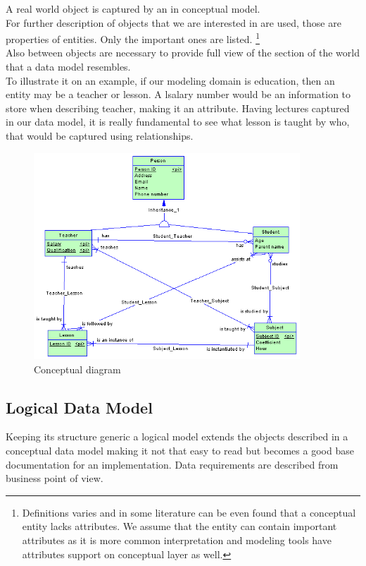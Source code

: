A real world object is captured by an  in conceptual model. \\
For further description of objects that we are interested in  are used, those are properties of entities. Only the important ones are listed. \footnote{Definitions varies and in some literature can be even found that a conceptual entity lacks attributes. We assume that the entity can contain important attributes as it is more common interpretation and modeling tools have attributes support on conceptual layer as well.} \\
Also  between objects are necessary to provide full view of the section of the world that a data model resembles. \\

To illustrate it on an example, if our modeling domain is education, then an entity may be a teacher or lesson. 
A lsalary number would be an information to store when describing teacher, making it an attribute.
Having lectures captured in our data model, it is really fundamental to see what lesson is taught by who, that would be captured using relationships.

\begin{figure}[H]
	\centering
	\includegraphics[width=10cm]{../img/Conceptual_Model_PowerDesigner}
	\caption{Conceptual diagram\cite{PowerDesignerDocumentation}}
\end{figure}

\subsection{Logical Data Model}

Keeping its structure generic a logical model extends the objects described in a conceptual data model making it not that easy to read but becomes a good base documentation for an implementation. Data requirements are described from business point of view.

